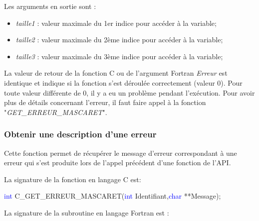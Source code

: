\documentclass[a4paper,11pt]{article}
\begin{document}
 \vspace{0.5cm}
 
 Les arguments en sortie sont :

  \vspace{0.5cm}

  \begin{itemize}
  
     \item \textit{taille1} : valeur maximale du 1er indice pour acc\'eder \`a la variable;
     \vspace{0.5cm}
     \item \textit{taille2} : valeur maximale du 2\`eme indice pour acc\'eder \`a la variable;  
     \vspace{0.5cm}
     \item \textit{taille3} : valeur maximale du 3\`eme indice pour acc\'eder \`a la variable;  
     \vspace{0.5cm}
  \end{itemize}
  
  \vspace{0.5cm}
  
  La valeur de retour de la fonction C ou de l'argument Fortran \textit{Erreur} est identique et indique si la fonction s'est d\'eroul\'ee correctement (valeur 0). Pour toute valeur diff\'erente de 0, il y a eu un probl\`eme pendant l'ex\'ecution. Pour avoir plus de d\'etails concernant l'erreur, il faut faire appel \`a la fonction "\textit{GET\_ERREUR\_MASCARET}".

\subsubsection{Obtenir une description d'une erreur}

 Cette fonction permet de r\'ecup\'erer le message d'erreur correspondant \`a une erreur qui s'est produite lors de l'appel pr\'ec\'edent d'une fonction de l'API.
 
 \vspace{0.5cm}
 
 La signature de la fonction en langage C est:
 
 \vspace{0.5cm}
 
 \textcolor{blue}{int} C\_GET\_ERREUR\_MASCARET(\textcolor{blue}{int} Identifiant,\textcolor{blue}{char} **Message);
 
 \vspace{0.5cm} 
 
  La signature de la subroutine en langage Fortran est :
 
\end{document}
